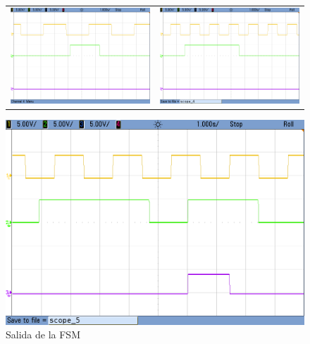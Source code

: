 \begin{figure}[H]
    \centering
    \begin{tabular}{c c}
        \includegraphics[scale=0.2]{../EJ2/Mediciones/Salida/cropped_scope_3.png} & 
        \includegraphics[scale=0.2]{../EJ2/Mediciones/Salida/cropped_scope_4.png} \\ 
    \end{tabular}
    \includegraphics[scale=0.2]{../EJ2/Mediciones/Salida/cropped_scope_5.png}
    \caption{Salida de la FSM}
    \label{fig:fsm_ejercicio_2_salida}
\end{figure}

